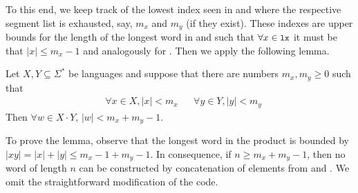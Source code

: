 To this end, we keep track of the lowest index
seen in  and  where the respective segment list is
exhausted, say, $m_x$ and $m_y$ (if they exist). These indexes
are upper bounds for the length of the longest word in  and
 such that $\forall x \in \code{lx}$ it must be that
$|x|\le m_x-1$ and analogously for . Then we apply the
following lemma.
\begin{lemma}
  Let $X, Y \subseteq \Sigma^*$ be languages and suppose that there
  are numbers $m_x, m_y \ge 0$ such that
  \begin{align*}
    & \forall x \in X, |x| < m_x
    && \forall y \in Y, |y| < m_y
  \end{align*}
  Then $\forall w\in X\cdot Y$, $|w| < m_x + m_y -1$.
\end{lemma}
To prove the lemma, observe that the longest word in
the product is bounded by $|xy| = |x| + |y| \le m_x -1 + m_y -1$. In
consequence, if $n \ge m_x + m_y - 1$, then no word of
length $n$ can be constructed by concatenation of elements from
 and
.
We omit the straightforward modification of the code.

